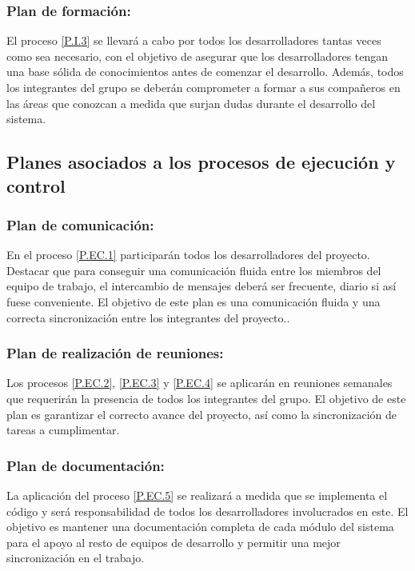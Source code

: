 \documentclass{article}
\begin{document}
\subsubsection{Plan de formación:} \label{PL.I.3}

El proceso \ref{P.I.3} se llevará a cabo por todos los desarrolladores tantas veces como sea necesario, con el objetivo de asegurar que los desarrolladores tengan una base sólida de conocimientos antes de comenzar el desarrollo. Además, todos los integrantes del grupo se deberán comprometer a formar a sus compañeros en las áreas que conozcan a medida que surjan dudas durante el desarrollo del sistema.

\subsection{Planes asociados a los procesos de ejecución y control}

\subsubsection{Plan de comunicación:} \label{PL.EC.1}

En el proceso \ref{P.EC.1} participarán todos los desarrolladores del proyecto. Destacar que para conseguir una comunicación fluida entre los miembros del equipo de trabajo, el intercambio de mensajes deberá ser frecuente, diario si así fuese conveniente. El objetivo de este plan es una comunicación fluida y una correcta sincronización entre los integrantes del proyecto..

\subsubsection{Plan de realización de reuniones:} \label{PL.EC.2} %

Los procesos \ref{P.EC.2}, \ref{P.EC.3} y \ref{P.EC.4} se aplicarán en reuniones semanales que requerirán la presencia de todos los integrantes del grupo. El objetivo de este plan es garantizar el correcto avance del proyecto, así como la sincronización de tareas a cumplimentar.

\subsubsection{Plan de documentación:} \label{PL.EC.3}

La aplicación del proceso \ref{P.EC.5} se realizará a medida que se implementa el código y será responsabilidad de todos los desarrolladores involucrados en este. El objetivo es mantener una documentación completa de cada módulo del sistema para el apoyo al resto de equipos de desarrollo y permitir una mejor sincronización en el trabajo.
\end{document}
